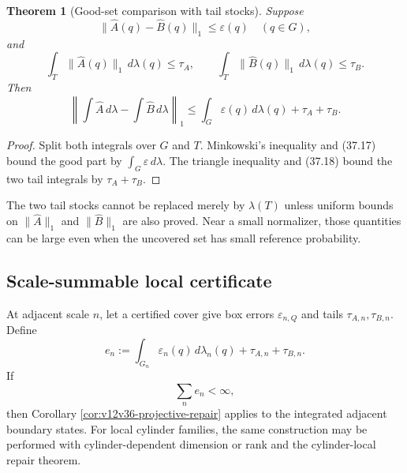 \documentclass[11pt]{article}
\newtheorem{theorem}{Theorem}[section]
\theoremstyle{remark}
\begin{document}
\begin{theorem}[Good-set comparison with tail stocks]
\label{thm:v12v37-tail}
Suppose
\begin{equation}
 \|\widehat A(q)-\widehat B(q)\|_1
 \leq\varepsilon(q)
 \quad(q\in G),                                   \tag{37.17}
\end{equation}
and
\begin{equation}
 \int_T\|\widehat A(q)\|_1\,d\lambda(q)\leq\tau_A,
 \qquad
 \int_T\|\widehat B(q)\|_1\,d\lambda(q)\leq\tau_B. \tag{37.18}
\end{equation}
Then
\begin{equation}
 \left\|
 \int\widehat A\,d\lambda-
 \int\widehat B\,d\lambda
 \right\|_1
 \leq
 \int_G\varepsilon(q)\,d\lambda(q)+\tau_A+\tau_B.
                                                        \tag{37.19}
\end{equation}
\end{theorem}

\begin{proof}
Split both integrals over \(G\) and \(T\).  Minkowski's inequality
and (37.17) bound the good part by
\(\int_G\varepsilon\,d\lambda\).  The triangle inequality and
(37.18) bound the two tail integrals by \(\tau_A+\tau_B\).
\end{proof}

The two tail stocks cannot be replaced merely by
\(\lambda(T)\) unless uniform bounds on
\(\|\widehat A\|_1\) and \(\|\widehat B\|_1\) are also proved.
Near a small normalizer, those quantities can be large even when the
uncovered set has small reference probability.

\subsection{Scale-summable local certificate}

At adjacent scale \(n\), let a certified cover give box errors
\(\varepsilon_{n,Q}\) and tails
\(\tau_{A,n},\tau_{B,n}\).  Define
\begin{equation}
 e_n:=
 \int_{G_n}\varepsilon_n(q)\,d\lambda_n(q)
 +\tau_{A,n}+\tau_{B,n}.                          \tag{37.20}
\end{equation}
If
\begin{equation}
                         \sum_ne_n<\infty,        \tag{37.21}
\end{equation}
then Corollary \ref{cor:v12v36-projective-repair} applies to the
integrated adjacent boundary states.  For local cylinder families,
the same construction may be performed with cylinder-dependent
dimension or rank and the cylinder-local repair theorem.
\end{document}
